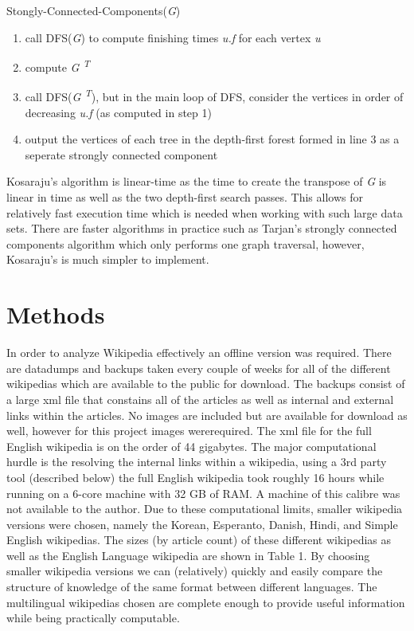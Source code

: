 \documentclass[twoside]{article}
\begin{document}
\begin{multicols}{2}
\newpage

Stongly-Connected-Components({\it G})

\begin{enumerate}

\item call DFS({\it G}) to compute finishing times {\it u.f} for each vertex {\it u}

\item compute {\it G \textsuperscript{T}}

\item call DFS({\it G \textsuperscript{T}}), but in the main loop of DFS, consider the vertices
in order of decreasing {\it u.f} (as computed in step 1)

\item output the vertices of each tree in the depth-first forest formed in line 3 as a seperate
strongly connected component

\end{enumerate}

Kosaraju's algorithm is linear-time as the time to create the transpose of {\it G} is
linear in time as well as the two depth-first search passes. This allows for relatively fast
execution time which is needed when working with such large data sets. There are faster
algorithms in practice such as Tarjan's strongly connected components algorithm which only performs
one graph traversal, however,  Kosaraju's is much simpler to implement.




\section{Methods}

In order to analyze Wikipedia effectively an offline version was required. There are datadumps
and backups taken every couple of weeks for all of the different wikipedias which are available
 to the public for download. The backups consist of a large xml file that constains all of the articles
 as well as internal and external links within the articles. No images are included but are available for download
 as well, however for this project images wererequired. The xml file for the full English wikipedia is on the order of
 44 gigabytes. The major computational hurdle is the resolving the internal links within a wikipedia, using a 3rd party tool
(described below) the full English wikipedia took roughly 16 hours while running on a 6-core machine with 32
GB of RAM. A machine of this calibre was not available to the author. 
Due to these computational limits, smaller wikipedia versions were chosen, namely the Korean, Esperanto, Danish,
Hindi, and Simple English wikipedias. The sizes  (by article count)  of these different wikipedias as well as the English Language 
wikipedia are shown in Table 1.
By choosing smaller wikipedia versions we can (relatively) quickly and easily compare 
the structure of knowledge of the same format between different languages. The multilingual
wikipedias chosen are complete enough to provide useful information while being practically computable.


\end{multicols}
\end{document}
